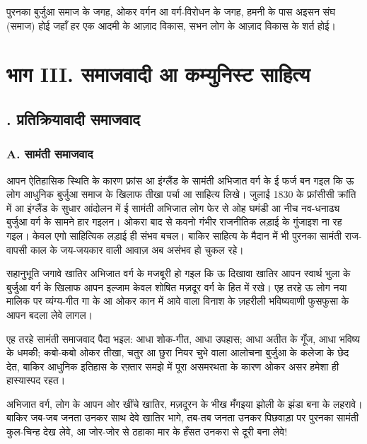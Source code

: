 \documentclass[12pt,a4paper,oneside]{book}
\begin{document}
पुरनका बुर्जुआ समाज के जगह, ओकर वर्गन आ वर्ग-विरोधन के जगह, हमनी के पास अइसन संघ (समाज) होई जहाँ हर एक आदमी के आज़ाद विकास, सभन लोग के आज़ाद विकास के शर्त होई।

\cleardoublepage
\chapter*{भाग {\engfont III}. समाजवादी आ कम्युनिस्ट साहित्य}

\section*{{}. प्रतिक्रियावादी समाजवाद}

\subsection*{{\engfont A}. सामंती समाजवाद}
आपन ऐतिहासिक स्थिति के कारण फ्रांस आ इंग्लैंड के सामंती अभिजात वर्ग के ई फर्ज बन गइल कि ऊ लोग आधुनिक बुर्जुआ समाज के खिलाफ तीखा पर्चा आ साहित्य लिखे। जुलाई 1830 के फ्रांसीसी क्रांति में आ इंग्लैंड के सुधार आंदोलन में ई सामंती अभिजात लोग फेर से ओह घमंडी आ नीच नव-धनाढ्य बुर्जुआ वर्ग के सामने हार गइलन। ओकरा बाद से कवनो गंभीर राजनीतिक लड़ाई के गुंजाइश ना रह गइल। केवल एगो साहित्यिक लड़ाई ही संभव बचल। बाकिर साहित्य के मैदान में भी पुरनका सामंती राज-वापसी काल के जय-जयकार वाली आवाज़ अब असंभव हो चुकल रहे।

सहानुभूति जगावे खातिर अभिजात वर्ग के मजबूरी हो गइल कि ऊ दिखावा खातिर आपन स्वार्थ भुला के बुर्जुआ वर्ग के खिलाफ आपन इल्जाम केवल शोषित मज़दूर वर्ग के हित में रखे। एह तरहे ऊ लोग नया मालिक पर व्यंग्य-गीत गा के आ ओकर कान में आवे वाला विनाश के ज़हरीली भविष्यवाणी फुसफुसा के आपन बदला लेवे लागल।

एह तरहे सामंती समाजवाद पैदा भइल: आधा शोक-गीत, आधा उपहास; आधा अतीत के गूँज, आधा भविष्य के धमकी; कबो-कबो ओकर तीखा, चतुर आ छुरा नियर चुभे वाला आलोचना बुर्जुआ के कलेजा के छेद देत, बाकिर आधुनिक इतिहास के रफ़्तार समझे में पूरा असमरथता के कारण ओकर असर हमेशा ही हास्यास्पद रहत।

अभिजात वर्ग, लोग के आपन ओर खींचे खातिर, मज़दूरन के भीख मँगइया झोली के झंडा बना के लहरावे। बाकिर जब-जब जनता उनकर साथ देवे खातिर भागे, तब-तब जनता उनकर पिछवाड़ा पर पुरनका सामंती कुल-चिन्ह देख लेवे, आ जोर-जोर से ठहाका मार के हँसत उनकरा से दूरी बना लेवे!
\end{document}
